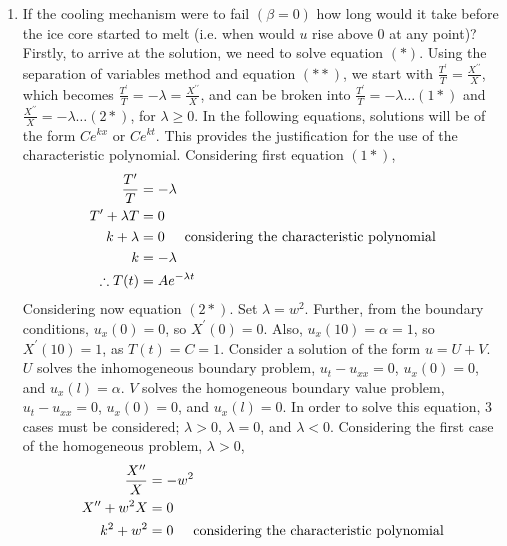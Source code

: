 \documentclass[a4paper]{article}
\newcommand{\ds}{\displaystyle}
\begin{document}
\begin{enumerate}
\begin{enumerate}
		\item If the cooling mechanism were to fail $\ds{(\beta = 0)}$ how long would it take before the ice core started to melt (i.e. when would $\ds{u}$ rise above 0 at any point)?
		\bigbreak
		Firstly, to arrive at the solution, we need to solve equation $\ds{(*)}$. Using the separation of variables method and equation $\ds{(**)}$, we start with $\ds{\frac{T^{\prime}}{T} = \frac{X^{\prime\prime}}{X}}$, which becomes $\ds{\frac{T^{\prime}}{T} = -\lambda = \frac{X^{\prime\prime}}{X}}$, and can be broken into $\ds{\frac{T^{\prime}}{T} = -\lambda \dots(1*)}$ and $\ds{\frac{X^{\prime\prime}}{X} = -\lambda \dots(2*)}$, for $\ds{\lambda \geq 0}$.
		\bigbreak
		In the following equations, solutions will be of the form $\ds{Ce^{kx}}$ or $\ds{Ce^{kt}}$. This provides the justification for the use of the characteristic polynomial. Considering first equation $\ds{(1*)}$, 
		\begin{align*}
			\frac{T^{\prime}}{T} & = -\lambda\\
			T^{\prime} + \lambda T & = 0\\
			k + \lambda & = 0 \hspace{5mm} \text{considering the characteristic polynomial}\\
			k & = -\lambda\\
			\therefore T(t) & = Ae^{-\lambda t}\\
		\end{align*}
		Considering now equation $\ds{(2*)}$. Set $\ds{\lambda = w^2}$. Further, from the boundary conditions, $\ds{u_x(0) = 0}$, so $\ds{X^{\prime}(0) = 0}$. Also, $\ds{u_x(10) = \alpha = 1}$, so $\ds{X^{\prime}(10) = 1}$, as $\ds{T(t) = C = 1}$. Consider a solution of the form $\ds{u = U + V}$. $\ds{U}$ solves the inhomogeneous boundary problem, $\ds{u_t-u_{xx} = 0}$, $\ds{u_x(0) = 0}$, and $\ds{u_x(l) = \alpha}$. $\ds{V}$ solves the homogeneous boundary value problem, $\ds{u_t-u_{xx} = 0}$, $\ds{u_x(0) = 0}$, and $\ds{u_x(l) = 0}$. 
		\bigbreak
		In order to solve this equation, 3 cases must be considered; $\ds{\lambda > 0}$, $\ds{\lambda = 0}$, and $\ds{\lambda < 0}$. Considering the first case of the homogeneous problem, $\ds{\lambda > 0}$, 
		\begin{align*}
			\frac{X^{\prime\prime}}{X} & = -w^2\\
			X^{\prime\prime} + w^2X & = 0\\
			k^2 + w^2 & = 0 \hspace{5mm} \text{considering the characteristic polynomial}\\

\end{align*}
\end{enumerate}
\end{enumerate}
\end{document}
